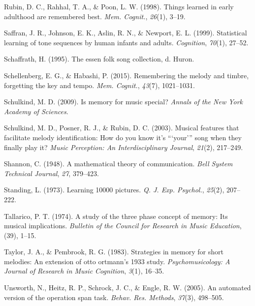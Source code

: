 \documentclass[english,man,floatsintext]{apa6}
\begin{document}
\leavevmode\hypertarget{ref-Rubin1998-pp}{}%
Rubin, D. C., Rahhal, T. A., \& Poon, L. W. (1998). Things learned in early adulthood are remembered best. \emph{Mem. Cognit.}, \emph{26}(1), 3--19.

\leavevmode\hypertarget{ref-Saffran1999-tn}{}%
Saffran, J. R., Johnson, E. K., Aslin, R. N., \& Newport, E. L. (1999). Statistical learning of tone sequences by human infants and adults. \emph{Cognition}, \emph{70}(1), 27--52.

\leavevmode\hypertarget{ref-Schaffrath1995-ci}{}%
Schaffrath, H. (1995). The essen folk song collection, d. Huron.

\leavevmode\hypertarget{ref-Schellenberg2015-jh}{}%
Schellenberg, E. G., \& Habashi, P. (2015). Remembering the melody and timbre, forgetting the key and tempo. \emph{Mem. Cognit.}, \emph{43}(7), 1021--1031.

\leavevmode\hypertarget{ref-Schulkind2009-xz}{}%
Schulkind, M. D. (2009). Is memory for music special? \emph{Annals of the New York Academy of Sciences}.

\leavevmode\hypertarget{ref-Schulkind2003-je}{}%
Schulkind, M. D., Posner, R. J., \& Rubin, D. C. (2003). Musical features that facilitate melody identification: How do you know it's ```your''' song when they finally play it? \emph{Music Perception: An Interdisciplinary Journal}, \emph{21}(2), 217--249.

\leavevmode\hypertarget{ref-Shannon1948-bu}{}%
Shannon, C. (1948). A mathematical theory of communication. \emph{Bell System Technical Journal}, \emph{27}, 379--423.

\leavevmode\hypertarget{ref-Standing1973-ou}{}%
Standing, L. (1973). Learning 10000 pictures. \emph{Q. J. Exp. Psychol.}, \emph{25}(2), 207--222.

\leavevmode\hypertarget{ref-Tallarico1974-mx}{}%
Tallarico, P. T. (1974). A study of the three phase concept of memory: Its musical implications. \emph{Bulletin of the Council for Research in Music Education}, (39), 1--15.

\leavevmode\hypertarget{ref-Taylor1983-uc}{}%
Taylor, J. A., \& Pembrook, R. G. (1983). Strategies in memory for short melodies: An extension of otto ortmann's 1933 study. \emph{Psychomusicology: A Journal of Research in Music Cognition}, \emph{3}(1), 16--35.

\leavevmode\hypertarget{ref-Unsworth2005-tz}{}%
Unsworth, N., Heitz, R. P., Schrock, J. C., \& Engle, R. W. (2005). An automated version of the operation span task. \emph{Behav. Res. Methods}, \emph{37}(3), 498--505.
\end{document}
